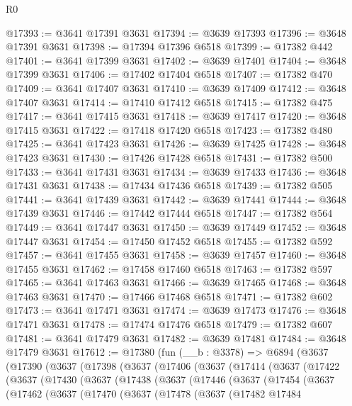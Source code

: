 \begin{lexlean}{R0}
\begin{coremodule}
@17393 := @3641 @17391 @3631
@17394 := @3639 @17393
@17396 := @3648 @17391 @3631
@17398 := @17394 @17396 @6518
@17399 := @17382 @442
@17401 := @3641 @17399 @3631
@17402 := @3639 @17401
@17404 := @3648 @17399 @3631
@17406 := @17402 @17404 @6518
@17407 := @17382 @470
@17409 := @3641 @17407 @3631
@17410 := @3639 @17409
@17412 := @3648 @17407 @3631
@17414 := @17410 @17412 @6518
@17415 := @17382 @475
@17417 := @3641 @17415 @3631
@17418 := @3639 @17417
@17420 := @3648 @17415 @3631
@17422 := @17418 @17420 @6518
@17423 := @17382 @480
@17425 := @3641 @17423 @3631
@17426 := @3639 @17425
@17428 := @3648 @17423 @3631
@17430 := @17426 @17428 @6518
@17431 := @17382 @500
@17433 := @3641 @17431 @3631
@17434 := @3639 @17433
@17436 := @3648 @17431 @3631
@17438 := @17434 @17436 @6518
@17439 := @17382 @505
@17441 := @3641 @17439 @3631
@17442 := @3639 @17441
@17444 := @3648 @17439 @3631
@17446 := @17442 @17444 @6518
@17447 := @17382 @564
@17449 := @3641 @17447 @3631
@17450 := @3639 @17449
@17452 := @3648 @17447 @3631
@17454 := @17450 @17452 @6518
@17455 := @17382 @592
@17457 := @3641 @17455 @3631
@17458 := @3639 @17457
@17460 := @3648 @17455 @3631
@17462 := @17458 @17460 @6518
@17463 := @17382 @597
@17465 := @3641 @17463 @3631
@17466 := @3639 @17465
@17468 := @3648 @17463 @3631
@17470 := @17466 @17468 @6518
@17471 := @17382 @602
@17473 := @3641 @17471 @3631
@17474 := @3639 @17473
@17476 := @3648 @17471 @3631
@17478 := @17474 @17476 @6518
@17479 := @17382 @607
@17481 := @3641 @17479 @3631
@17482 := @3639 @17481
@17484 := @3648 @17479 @3631
@17612 := @17380
    (fun (__b : @3378) =>
    @6894
      (@3637
        (@17390
          (@3637
            (@17398
              (@3637
                (@17406
                  (@3637
                    (@17414
                      (@3637
                        (@17422
                          (@3637
                            (@17430
                              (@3637
                                (@17438
                                  (@3637
                                    (@17446
                                      (@3637
                                        (@17454
                                          (@3637
                                            (@17462
                                              (@3637
                                                (@17470
                                                  (@3637
                                                    (@17478
                                                      (@3637
                                                        (@17482
                                                          @17484

\end{coremodule}
\end{lexlean}
